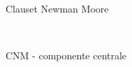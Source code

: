 \documentclass[12pt,a4paper,twoside]{report}
\begin{document}
\begin{figure}[ht]
\begin{subfigure}[b]{0.5\textwidth}
            \caption{Clauset Newman Moore}
        \end{subfigure}%
        ~
        \begin{subfigure}[b]{0.5\textwidth}
            \centering
            \setlength{\fboxrule}{0pt} %
            \caption{CNM - componente centrale}
        \end{subfigure}%
        \\
        \begin{subfigure}[b]{0.5\textwidth}
            \centering
            \setlength{\fboxrule}{0pt} %

\end{subfigure}
\end{figure}
\end{document}
